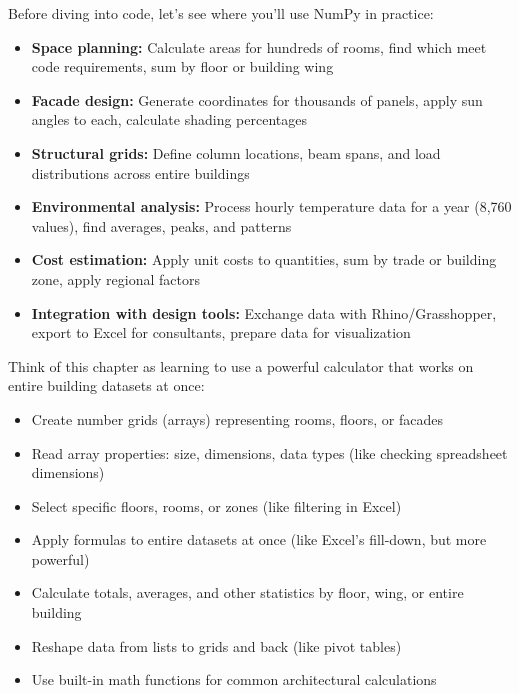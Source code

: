 
Before diving into code, let's see where you'll use NumPy in practice:

\begin{itemize}
\item \textbf{Space planning:} Calculate areas for hundreds of rooms, find which meet code requirements, sum by floor or building wing
\item \textbf{Facade design:} Generate coordinates for thousands of panels, apply sun angles to each, calculate shading percentages
\item \textbf{Structural grids:} Define column locations, beam spans, and load distributions across entire buildings
\item \textbf{Environmental analysis:} Process hourly temperature data for a year (8,760 values), find averages, peaks, and patterns
\item \textbf{Cost estimation:} Apply unit costs to quantities, sum by trade or building zone, apply regional factors
\item \textbf{Integration with design tools:} Exchange data with Rhino/Grasshopper, export to Excel for consultants, prepare data for visualization
\end{itemize}

\begin{tcolorbox}[
    title=Focus of this chapter:,
    colframe=orange,
    colback = white,
    arc=2mm
]
Think of this chapter as learning to use a powerful calculator that works on entire building datasets at once:
\begin{itemize}
\item Create number grids (arrays) representing rooms, floors, or facades
\item Read array properties: size, dimensions, data types (like checking spreadsheet dimensions)
\item Select specific floors, rooms, or zones (like filtering in Excel)
\item Apply formulas to entire datasets at once (like Excel's fill-down, but more powerful)
\item Calculate totals, averages, and other statistics by floor, wing, or entire building
\item Reshape data from lists to grids and back (like pivot tables)
\item Use built-in math functions for common architectural calculations
\end{itemize}
\end{tcolorbox}


